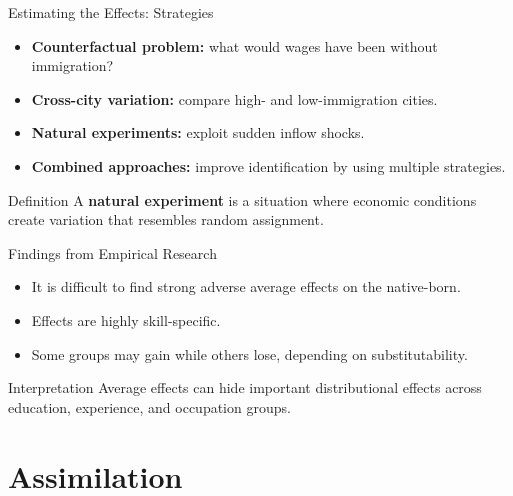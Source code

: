 \documentclass[aspectratio=169]{beamer}
\begin{document}
\begin{frame}{Estimating the Effects: Strategies}
\transfade
\begin{itemize}
  \item \textbf{Counterfactual problem:} what would wages have been without immigration?
  \item \textbf{Cross-city variation:} compare high- and low-immigration cities.
  \item \textbf{Natural experiments:} exploit sudden inflow shocks.
  \item \textbf{Combined approaches:} improve identification by using multiple strategies.
\end{itemize}

\begin{block}{Definition}
A \textbf{natural experiment} is a situation where economic conditions create variation that resembles random assignment.
\end{block}
\end{frame}

\begin{frame}{Findings from Empirical Research}
\transfade
\begin{itemize}
  \item It is difficult to find strong adverse average effects on the native-born.
  \item Effects are highly skill-specific.
  \item Some groups may gain while others lose, depending on substitutability.
\end{itemize}

\begin{block}{Interpretation}
Average effects can hide important distributional effects across education, experience, and occupation groups.
\end{block}
\end{frame}

\section{Assimilation}
\end{document}
